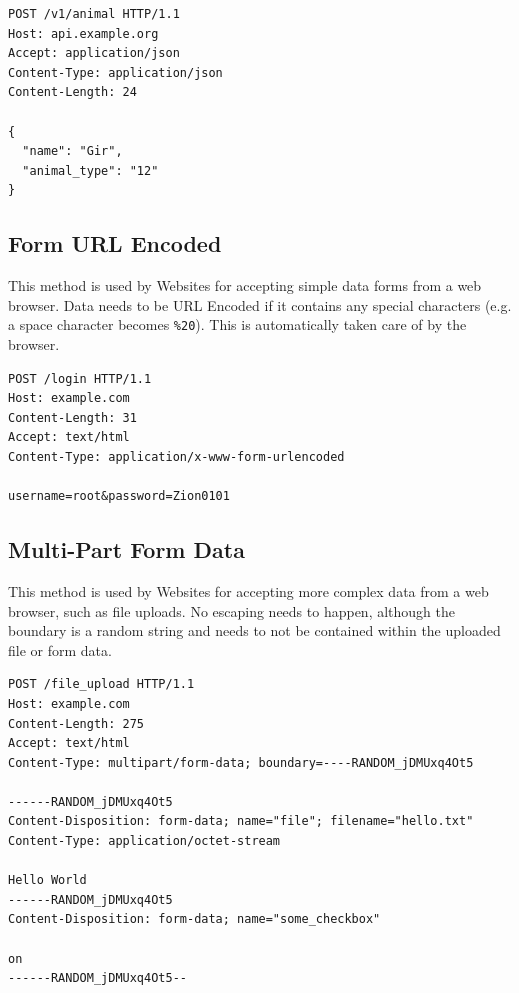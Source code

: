 \begin{verbatim}
POST /v1/animal HTTP/1.1
Host: api.example.org
Accept: application/json
Content-Type: application/json
Content-Length: 24

{
  "name": "Gir",
  "animal_type": "12"
}
\end{verbatim}

\subsection{Form URL Encoded}

This method is used by Websites for accepting simple data forms from a web browser. Data needs to be URL Encoded if it contains any special characters (e.g. a space character becomes \texttt{\%20}). This is automatically taken care of by the browser.

\begin{verbatim}
POST /login HTTP/1.1
Host: example.com
Content-Length: 31
Accept: text/html
Content-Type: application/x-www-form-urlencoded

username=root&password=Zion0101
\end{verbatim}

\subsection{Multi-Part Form Data}

This method is used by Websites for accepting more complex data from a web browser, such as file uploads. No escaping needs to happen, although the boundary is a random string and needs to not be contained within the uploaded file or form data.

\begin{verbatim}
POST /file_upload HTTP/1.1
Host: example.com
Content-Length: 275
Accept: text/html
Content-Type: multipart/form-data; boundary=----RANDOM_jDMUxq4Ot5

------RANDOM_jDMUxq4Ot5
Content-Disposition: form-data; name="file"; filename="hello.txt"
Content-Type: application/octet-stream

Hello World
------RANDOM_jDMUxq4Ot5
Content-Disposition: form-data; name="some_checkbox"

on
------RANDOM_jDMUxq4Ot5--
\end{verbatim}
